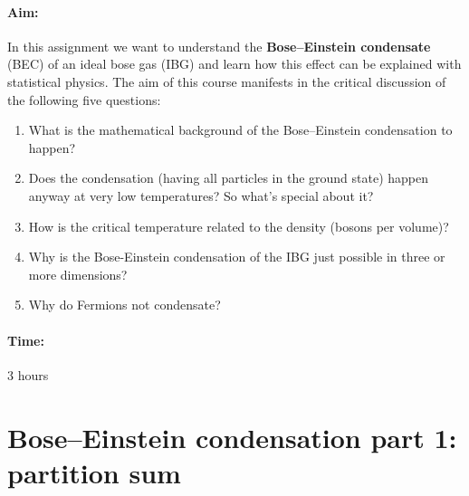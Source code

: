 \documentclass[12pt,a4paper]{article} %
\begin{document}
 
 
 \vspace{1cm}
 

  \paragraph{Aim:} In this assignment we want to understand the \textbf{Bose--Einstein condensate} (BEC) of an ideal bose gas (IBG) and learn how this effect can be explained with statistical physics. The aim of this course manifests in the critical discussion of the following five questions:
  \begin{enumerate}
 \item What is the mathematical background of the Bose--Einstein condensation to happen?
 \item Does the condensation (having all particles in the ground state) happen anyway at very low temperatures? So what's special about it?
 \item How is the critical temperature related to the density (bosons per volume)?
 \item Why is the Bose-Einstein condensation of the IBG just possible in three or more dimensions?
 \item Why do Fermions not condensate?
\end{enumerate}
  
 \paragraph{Time:} 3 hours  \\
 \section{Bose--Einstein condensation part 1: partition sum}
 
\end{document}

